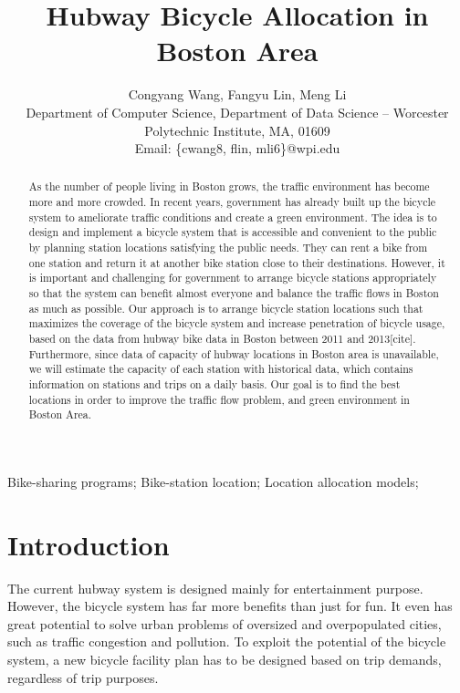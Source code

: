 \documentclass[journal, letterpaper]{IEEEtran}
\begin{document}
\title{Hubway Bicycle Allocation in Boston Area}
\author{Congyang Wang, Fangyu Lin, Meng Li \\ Department of Computer Science, Department of Data Science -- Worcester Polytechnic Institute, MA, 01609 \\ Email: \{cwang8, flin, mli6\}@wpi.edu}
\maketitle

\begin{abstract} 
\large As the number of people living in Boston grows, the traffic environment has become more and more crowded. In recent years, government has already built up the bicycle system to ameliorate traffic conditions and create a green environment. The idea is to design and implement a bicycle system that is accessible and convenient to the public by planning station locations satisfying the public needs. They can rent a bike from one station and return it at another bike station close to their destinations. However, it is important and challenging for government to arrange bicycle stations appropriately so that the system can benefit almost everyone and balance the traffic flows in Boston as much as possible. Our approach is to arrange bicycle station locations such that maximizes the coverage of the bicycle system and increase penetration of bicycle usage, based on the data from hubway bike data in Boston between 2011 and 2013[cite]. Furthermore, since data of capacity of hubway locations in Boston area is unavailable, we will estimate the capacity of each station with historical data, which contains information on stations and trips on a daily basis. Our goal is to find the best locations in order to improve the traffic flow problem, and green environment in Boston Area. 
\end{abstract}

\begin{IEEEkeywords}
Bike-sharing programs;
Bike-station location;
Location allocation models;
\end{IEEEkeywords}

\section{Introduction}
\large
The current hubway system is designed mainly for entertainment purpose. However, the bicycle system has far more benefits than just for fun. It even has great potential to solve urban problems of oversized and overpopulated cities, such as traffic congestion and pollution. To exploit the potential of the bicycle system, a new bicycle facility plan has to be designed based on trip demands, regardless of trip purposes. 
\end{document}
